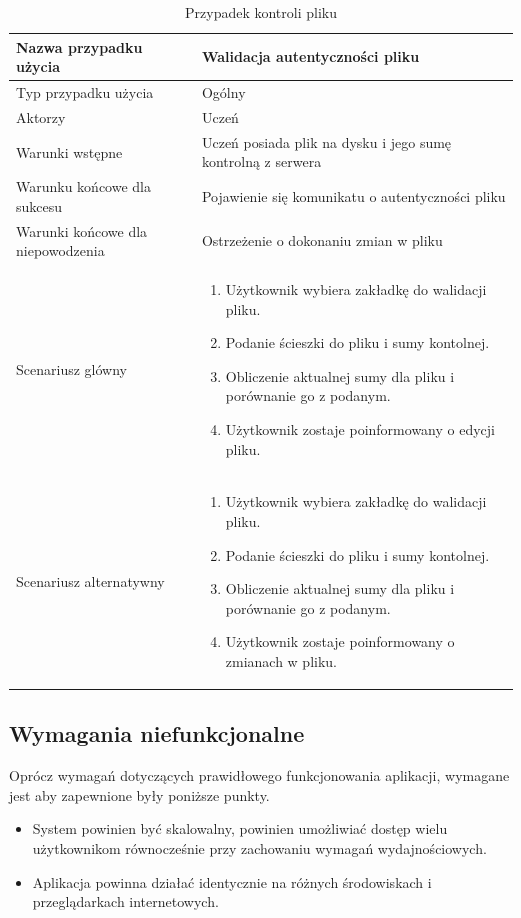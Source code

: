 \begin{table}[H]
    \centering
    \begin{tabular}{|l<{\raggedright}|p{3in}|}
    \hline
    Nazwa przypadku użycia & Walidacja autentyczności pliku  \\ \hline
    Typ przypadku użycia  & Ogólny  \\ \hline
    Aktorzy   & Uczeń    \\ \hline
    Warunki wstępne   & Uczeń posiada plik na dysku i jego sumę kontrolną z serwera    \\ \hline
    Warunku końcowe dla sukcesu   & Pojawienie się komunikatu o autentyczności pliku    \\ \hline
    Warunki końcowe dla niepowodzenia   & Ostrzeżenie o dokonaniu zmian w pliku     \\ \hline
   Scenariusz glówny   &

    \begin{enumerate}
    \itemsep0em
        \item Użytkownik wybiera zakładkę do walidacji pliku.
        \item Podanie ścieszki do pliku i sumy kontolnej.
        \item Obliczenie aktualnej sumy dla pliku i porównanie go z podanym.
        \item Użytkownik zostaje poinformowany o edycji pliku.
    \end{enumerate}
     \\ \hline
    Scenariusz alternatywny   &

    \begin{enumerate}
    \itemsep0em
        \item Użytkownik wybiera zakładkę do walidacji pliku.
        \item Podanie ścieszki do pliku i sumy kontolnej.
        \item Obliczenie aktualnej sumy dla pliku i porównanie go z podanym.
        \item Użytkownik zostaje poinformowany o zmianach w pliku.
    \end{enumerate}
         \\ \hline
    \end{tabular}
    \caption{Przypadek kontroli pliku}
    \label{tab:caseuse2}
\end{table}

\subsection{Wymagania niefunkcjonalne}
\label{sec:niefunkcjonalnes}

Oprócz wymagań dotyczących prawidłowego funkcjonowania aplikacji, wymagane jest
aby zapewnione były poniższe punkty.

\begin{itemize}
\item
System powinien być skalowalny, powinien umożliwiać dostęp wielu użytkownikom równocześnie przy zachowaniu wymagań wydajnościowych.

\item
Aplikacja powinna działać identycznie na różnych środowiskach i przeglądarkach internetowych.
\end{itemize}
